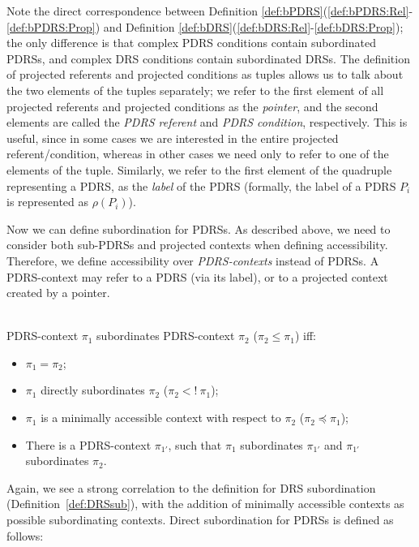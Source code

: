 \noindent Note the direct correspondence between Definition
\ref{def:bPDRS}(\ref{def:bPDRS:Rel}-\ref{def:bPDRS:Prop}) and Definition
\ref{def:bDRS}(\ref{def:bDRS:Rel}-\ref{def:bDRS:Prop}); the only difference
is that complex PDRS conditions contain subordinated PDRSs, and complex DRS
conditions contain subordinated DRSs.  The definition of projected referents
and projected conditions as tuples allows us to talk about the two elements
of the tuples separately; we refer to the first element of all projected
referents and projected conditions as the \textit{pointer}, and the second
elements are called the \textit{PDRS referent} and \textit{PDRS condition},
respectively. This is useful, since in some cases we are interested in the
entire projected referent/condition, whereas in other cases we need only to
refer to one of the elements of the tuple. Similarly, we refer to the first
element of the quadruple representing a PDRS, as the \textit{label} of the
PDRS (formally, the label of a PDRS $P_i$ is represented as $\rho(P_i)$).

Now we can define subordination for PDRSs. As described above, we need to
consider both sub-PDRSs and projected contexts when defining accessibility.
Therefore, we define accessibility over \textit{PDRS-contexts} instead of
PDRSs. A PDRS-context may refer to a PDRS (via its label), or to
a projected context created by a pointer.

\begin{definition}~\\
PDRS-context $\pi_1$ subordinates PDRS-context $\pi_2$ ($\pi_2 \leq \pi_1$)
iff:
\begin{itemize}
  \item $\pi_1 = \pi_2$;
  \item $\pi_1$ directly subordinates $\pi_2$ ($\pi_2 <!~\pi_1$);
  \item $\pi_1$ is a minimally accessible context with respect to $\pi_2$
    ($\pi_2 \preceq \pi_1$);    
  \item There is a PDRS-context $\pi_{1'}$, such that $\pi_1$ subordinates
    $\pi_{1'}$ and $\pi_{1'}$ subordinates $\pi_2$.
\end{itemize}
\end{definition}

\noindent Again, we see a strong correlation to the definition for DRS
subordination (Definition~\ref{def:DRSsub}), with the addition of minimally
accessible contexts as possible subordinating contexts. Direct subordination for
PDRSs is defined as follows:

